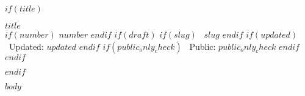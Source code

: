 $if(title)$
\begin{center}
  {\LARGE\bfseries $title$}\\[6pt]
  {\small
    $if(number)$ $number$ $endif$
    $if(draft)$
    $if(slug)$ \textbullet\ $slug$ $endif$
    $if(updated)$ \textbullet\ Updated: $updated$ $endif$
    $if(public_only_check)$ \textbullet\ Public: $public_only_check$ $endif$
    $endif$
  }
\end{center}
\medskip
$endif$

$body$

\clearpage
